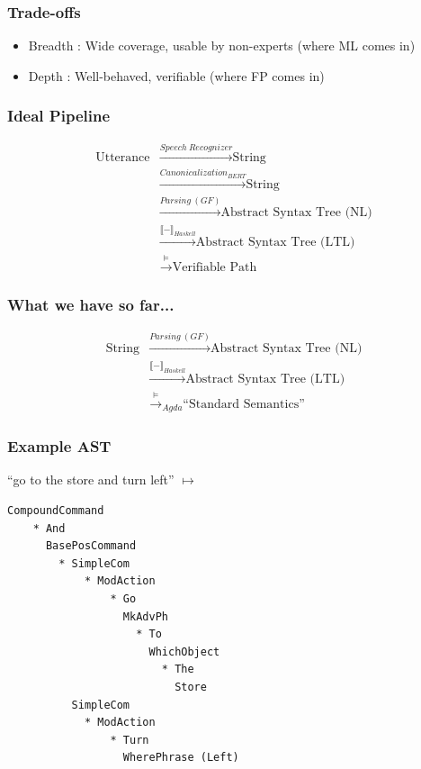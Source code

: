\documentclass{beamer}
\begin{document}
\begin{frame}

\frametitle{Trade-offs}

\begin{itemize}
\item Breadth : Wide coverage, usable by non-experts (where ML comes in)
\item Depth   : Well-behaved, verifiable (where FP comes in)
\end{itemize}

\end{frame}

\begin{frame}
\frametitle{Ideal Pipeline}

\begin{equation} %
\begin{split}
\text{Utterance} & \xrightarrow{\mathit{Speech\ Recognizer}} \text{String}\\
 & \xrightarrow{\mathit{Canonicalization_{BERT}}} \text{String}\\
 & \xrightarrow{\mathit{Parsing\ (GF)}} \text{Abstract Syntax Tree (NL)}\\
 & \xrightarrow{\llbracket - \rrbracket_{Haskell}} \text{Abstract Syntax Tree (LTL)}\\
 & \xrightarrow{\vDash} \text{Verifiable Path}
\end{split}
\end{equation} 
\end{frame}

\begin{frame}
\frametitle{What we have so far...}

\begin{equation} %
\begin{split}
\text{String} & \xrightarrow{\mathit{Parsing\ (GF)}} \text{Abstract Syntax Tree (NL)}\\
 & \xrightarrow{\llbracket - \rrbracket_{Haskell}} \text{Abstract Syntax Tree (LTL)}\\
 & \xrightarrow{\vDash}_{Agda} \text{``Standard Semantics''}
\end{split}
\end{equation} 
\end{frame}


\begin{frame}[fragile]
\frametitle{Example AST}
``go to the store and turn left'' $\mapsto$
\begin{verbatim}
CompoundCommand
    * And
      BasePosCommand
        * SimpleCom
            * ModAction
                * Go
                  MkAdvPh
                    * To
                      WhichObject
                        * The
                          Store
          SimpleCom
            * ModAction
                * Turn
                  WherePhrase (Left)
\end{verbatim}
\end{frame}
\end{document}
